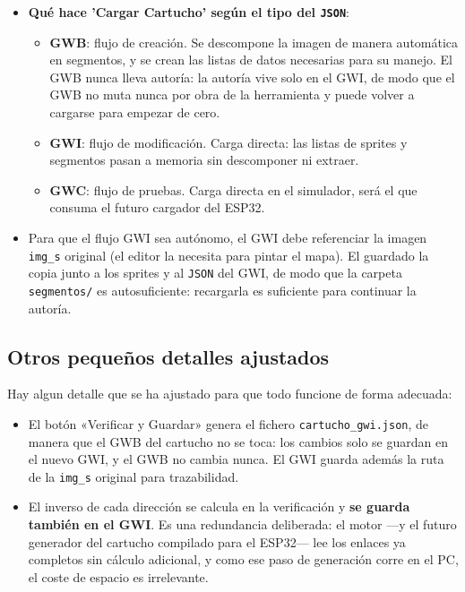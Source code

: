 \begin{itemize}
		\item  \textbf{Qué hace 'Cargar Cartucho' según el tipo del \texttt{JSON}}:
	
	\begin{itemize}
		\item \textbf{GWB}: flujo de creación. Se descompone la imagen de manera automática en segmentos, y se crean las  listas de datos necesarias para su manejo. El GWB nunca lleva autoría: la autoría vive solo en el GWI, de modo que el GWB no muta nunca por obra de la herramienta y puede volver a cargarse para empezar de cero.
		\item \textbf{GWI}: flujo de modificación. Carga directa: las listas de sprites y segmentos pasan a memoria sin descomponer ni extraer.
		\item \textbf{GWC}: flujo de pruebas. Carga directa en el simulador, será el que consuma el futuro cargador del ESP32.
	\end{itemize}
	
	\item 	Para que el flujo GWI sea autónomo, el GWI debe referenciar la imagen \texttt{img\_s} original (el editor la necesita para pintar el mapa). El guardado la copia junto a los sprites y al \texttt{JSON} del GWI, de modo que la carpeta \texttt{segmentos/} es autosuficiente: recargarla es suficiente para continuar la autoría.
\end{itemize}


\subsection{Otros pequeños detalles ajustados}
	Hay algun detalle que se ha ajustado para que todo funcione de forma adecuada:
\begin{itemize}
	\item El botón «Verificar y Guardar» genera el fichero \texttt{cartucho\_gwi.json}, de manera que el GWB del cartucho no se toca: los cambios solo se guardan en el nuevo GWI, y el GWB no cambia nunca. El GWI guarda además la ruta de la \texttt{img\_s} original para trazabilidad.
	\item El inverso de cada dirección se calcula en la verificación y \textbf{se guarda también en el GWI}. Es una redundancia deliberada: el motor —y el futuro generador del cartucho compilado para el ESP32— lee los enlaces ya completos sin cálculo adicional, y como ese paso de generación corre en el PC, el coste de espacio es irrelevante.
\end{itemize}

\clearpage